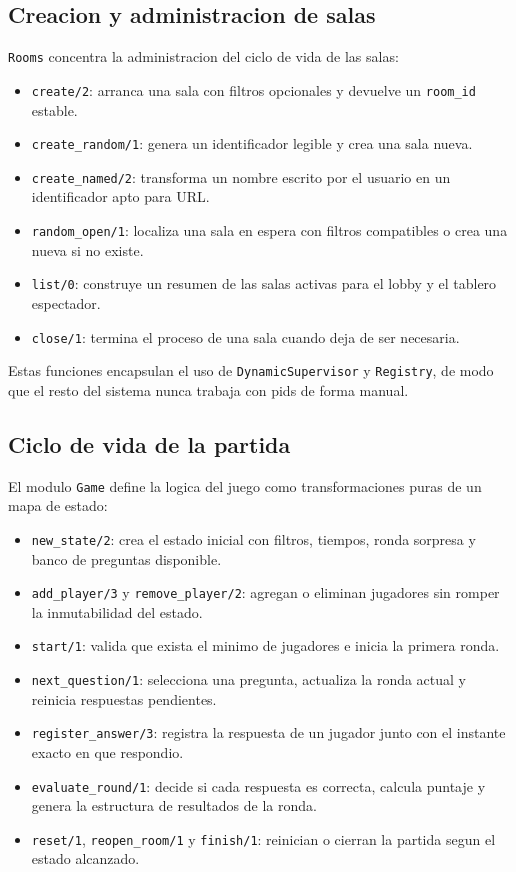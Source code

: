 \documentclass[12pt,a4paper]{article}
\begin{document}
\subsection{Creacion y administracion de salas}

\texttt{Rooms} concentra la administracion del ciclo de vida de las salas:

\begin{itemize}
  \item \texttt{create/2}: arranca una sala con filtros opcionales y devuelve
  un \texttt{room\_id} estable.
  \item \texttt{create\_random/1}: genera un identificador legible y crea una
  sala nueva.
  \item \texttt{create\_named/2}: transforma un nombre escrito por el usuario
  en un identificador apto para URL.
  \item \texttt{random\_open/1}: localiza una sala en espera con filtros
  compatibles o crea una nueva si no existe.
  \item \texttt{list/0}: construye un resumen de las salas activas para el
  lobby y el tablero espectador.
  \item \texttt{close/1}: termina el proceso de una sala cuando deja de ser
  necesaria.
\end{itemize}

Estas funciones encapsulan el uso de \texttt{DynamicSupervisor} y
\texttt{Registry}, de modo que el resto del sistema nunca trabaja con pids de
forma manual.

\subsection{Ciclo de vida de la partida}

El modulo \texttt{Game} define la logica del juego como transformaciones puras
de un mapa de estado:

\begin{itemize}
  \item \texttt{new\_state/2}: crea el estado inicial con filtros, tiempos,
  ronda sorpresa y banco de preguntas disponible.
  \item \texttt{add\_player/3} y \texttt{remove\_player/2}: agregan o eliminan
  jugadores sin romper la inmutabilidad del estado.
  \item \texttt{start/1}: valida que exista el minimo de jugadores e inicia la
  primera ronda.
  \item \texttt{next\_question/1}: selecciona una pregunta, actualiza la ronda
  actual y reinicia respuestas pendientes.
  \item \texttt{register\_answer/3}: registra la respuesta de un jugador junto
  con el instante exacto en que respondio.
  \item \texttt{evaluate\_round/1}: decide si cada respuesta es correcta,
  calcula puntaje y genera la estructura de resultados de la ronda.
  \item \texttt{reset/1}, \texttt{reopen\_room/1} y \texttt{finish/1}: reinician
  o cierran la partida segun el estado alcanzado.
\end{itemize}
\end{document}
